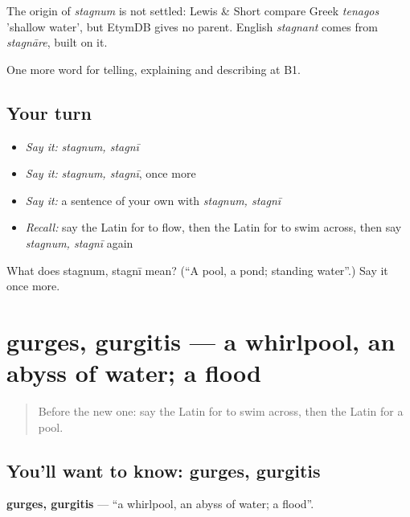 \begin{cousinweb}
The origin of \emph{stagnum} is not settled: Lewis \& Short compare Greek \emph{tenagos} 'shallow water', but EtymDB gives no parent. English \emph{stagnant} comes from \emph{stagnāre}, built on it.
\end{cousinweb}

\begin{grammarlens}[title={What you've built}]
One more word for telling, explaining and describing at B1.
\end{grammarlens}

\subsection*{Your turn}
\begin{itemize}
\raggedright
  \item \emph{Say it:} \emph{stagnum, stagnī}
  \item \emph{Say it:} \emph{stagnum, stagnī}, once more
  \item \emph{Say it:} a sentence of your own with \emph{stagnum, stagnī}
  \item \emph{Recall:} say the Latin for to flow, then the Latin for to swim across, then say \emph{stagnum, stagnī} again
\end{itemize}

\begin{tcolorbox}[breakable,colback=teal!4,colframe=teal!35!black,title={Before you move on}]
What does stagnum, stagnī mean? (\textquotedblleft{}A pool, a pond; standing water\textquotedblright{}.) Say it once more.
\end{tcolorbox}
\section[gurges, gurgitis]{gurges, gurgitis — a whirlpool, an abyss of water; a flood}

\label{lesson:LA-C483-gurges}



\begin{quote}
Before the new one: say the Latin for to swim across, then the Latin for a pool.
\end{quote}

\subsection*{You'll want to know: gurges, gurgitis}
\textbf{gurges, gurgitis} — \textquotedblleft{}a whirlpool, an abyss of water; a flood\textquotedblright{}.

